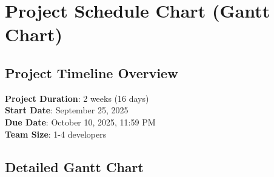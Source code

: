 \documentclass[11pt,a4paper]{article}
\begin{document}
\section{Project Schedule Chart (Gantt Chart)}

\subsection{Project Timeline Overview}

\textbf{Project Duration}: 2 weeks (16 days)\\
\textbf{Start Date}: September 25, 2025\\
\textbf{Due Date}: October 10, 2025, 11:59 PM\\
\textbf{Team Size}: 1-4 developers

\subsection{Detailed Gantt Chart}
\end{document}
